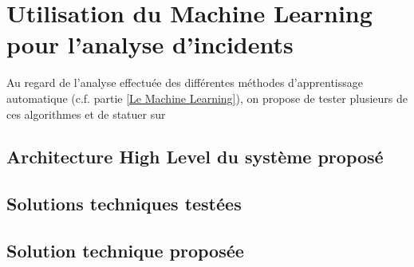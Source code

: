 \chapter{Utilisation du Machine Learning pour l'analyse d'incidents}
\label{Utilisation du Machine Learning pour l'analyse d'incidents}
\thispagestyle{fancy}

Au regard de l'analyse effectuée  des différentes méthodes d'apprentissage automatique (c.f. partie \ref{Le Machine Learning}), on propose de tester plusieurs de ces algorithmes et de statuer sur 
\section{Architecture High Level du système proposé}
\label{Utilisation du Machine Learning pour l'analyse d'incidents: Achitecture High Level du système proposé}

\section{Solutions techniques testées}
\label{Utilisation du Machine Learning pour l'analyse d'incidents: Solutions techniques testées}

\section{Solution technique proposée}
\label{Utilisation du Machine Learning pour l'analyse d'incidents: Solution technique proposée}

